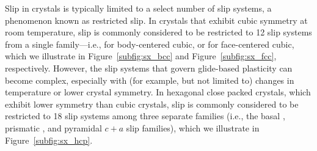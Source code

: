 \documentclass[preprint,3p,times,sort&compress,letterpaper,12pt]{elsarticle} %
\begin{document}
Slip in crystals is typically limited to a select number of slip systems, a phenomenon known as restricted slip. In crystals that exhibit cubic symmetry at room temperature, slip is commonly considered to be restricted to 12 slip systems from a single family---i.e.,  for body-centered cubic, or  for face-centered cubic, which we illustrate in Figure~\ref{subfig:sx_bcc} and Figure~\ref{subfig:sx_fcc}, respectively. However, the slip systems that govern glide-based plasticity can become complex, especially with (for example, but not limited to) changes in temperature or lower crystal symmetry. In hexagonal close packed crystals, which exhibit lower symmetry than cubic crystals, slip is commonly considered to be restricted to 18 slip systems among three separate families (i.e., the basal , prismatic , and pyramidal $c+a$  slip families), which we illustrate in Figure~\ref{subfig:sx_hcp}.
\end{document}
